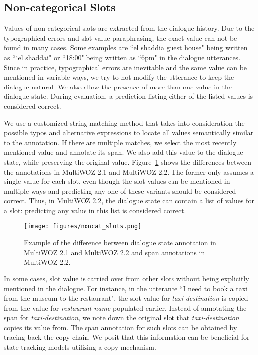 \subsection{Non-categorical Slots}

Values of non-categorical slots are extracted from the dialogue history. Due to the typographical errors and slot value paraphrasing, the exact value can not be found in many cases. Some examples are ``el shaddia guest house" being written as ```el shaddai" or ``18:00" being written as ``6pm" in the dialogue utterances.
Since in practice, typographical errors are inevitable and the same value can be mentioned in variable ways, we try to not modify the utterance to keep the dialogue natural. We also allow the presence of more than one value in the dialogue state. During evaluation, a prediction listing either of the listed values is considered correct.

We use a customized string matching method that takes into consideration the possible typos and alternative expressions to locate all values semantically similar to the annotation. If there are multiple matches, we select the most recently mentioned value and annotate its span. We also add this value to the dialogue state, while preserving the original value. Figure~\ref{fig:noncat_slot} shows the differences between the annotations in MultiWOZ 2.1 and MultiWOZ 2.2. The former only assumes a single value for each slot, even though the slot values can be mentioned in multiple ways and predicting any one of these variants should be considered correct. Thus, in MultiWOZ 2.2, the dialogue state can contain a list of values for a slot: predicting any value in this list is considered correct.

\begin{figure}[t]
\centering
\texttt{[image: figures/noncat\_slots.png]}
\setlength{\belowcaptionskip}{-10pt}
\caption{Example of the difference between dialogue state annotation in MultiWOZ 2.1 and MultiWOZ 2.2 and span annotations in MultiWOZ 2.2.}
\label{fig:noncat_slot}
\end{figure}

In some cases, slot value is carried over from other slots without being explicitly mentioned in the dialogue. For instance, in the utterance ``I need to book a taxi from the museum to the restaurant", the slot value for \textit{taxi-destination} is copied from the value for \textit{restaurant-name} populated earlier. Instead of annotating the span for \textit{taxi-destination}, we note down the original slot that \textit{taxi-destination} copies its value from. The span annotation for such slots can be obtained by tracing back the copy chain. We posit that this information can be beneficial for state tracking models utilizing a copy mechanism. 

